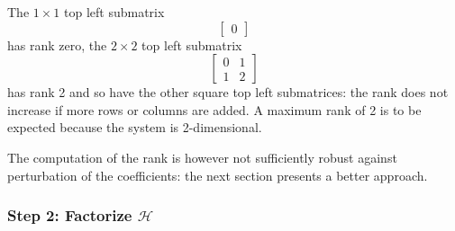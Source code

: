 The $1\times 1$ top left submatrix
\begin{equation*}
  \begin{bmatrix} 0\end{bmatrix}
\end{equation*}
has rank zero, the $2\times 2$ top left submatrix
\begin{equation*}
  \begin{bmatrix}
    0 & 1 \\
    1 & 2
  \end{bmatrix}
\end{equation*}
has rank 2 and so have the other square top left submatrices: the rank does not increase if more rows or columns are added. A maximum rank of 2 is to be expected because the system is 2-dimensional.

The computation of the rank is however not sufficiently robust against perturbation of the coefficients: the next section presents a better approach.



\subsubsection{Step 2: Factorize $\mathcal{H}$}
\label{sec:factorize-Hankel}

